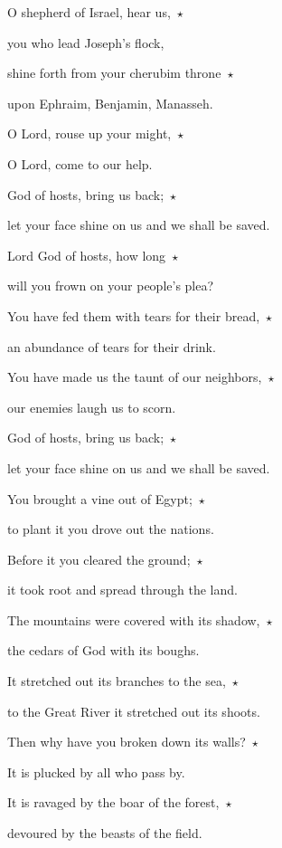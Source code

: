 \noindent O shepherd of Israel, hear us,~$\star$~\nopagebreak

you who lead Joseph’s flock,

\noindent shine forth from your cherubim throne~$\star$~\nopagebreak

upon Ephraim, Benjamin, Manasseh.

\noindent O Lord, rouse up your might,~$\star$~\nopagebreak

O Lord, come to our help.

\noindent God of hosts, bring us back;~$\star$~\nopagebreak

let your face shine on us and we shall be saved.

\noindent Lord God of hosts, how long~$\star$~\nopagebreak

will you frown on your people’s plea?

\noindent You have fed them with tears for their bread,~$\star$~\nopagebreak

an abundance of tears for their drink.

\noindent You have made us the taunt of our neighbors,~$\star$~\nopagebreak

our enemies laugh us to scorn.

\noindent God of hosts, bring us back;~$\star$~\nopagebreak

let your face shine on us and we shall be saved.

\noindent You brought a vine out of Egypt;~$\star$~\nopagebreak

to plant it you drove out the nations.

\noindent Before it you cleared the ground;~$\star$~\nopagebreak

it took root and spread through the land.

\noindent The mountains were covered with its shadow,~$\star$~\nopagebreak

the cedars of God with its boughs.

\noindent It stretched out its branches to the sea,~$\star$~\nopagebreak

to the Great River it stretched out its shoots.

\noindent Then why have you broken down its walls?~$\star$~\nopagebreak

It is plucked by all who pass by.

\noindent It is ravaged by the boar of the forest,~$\star$~\nopagebreak

devoured by the beasts of the field.

